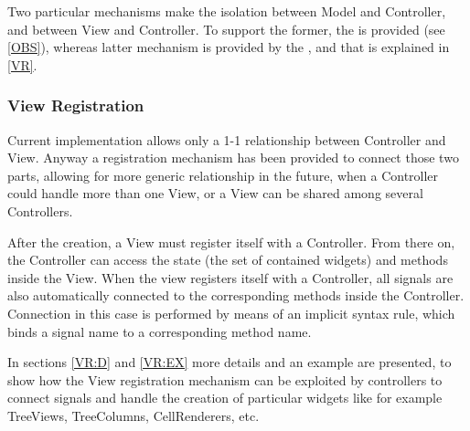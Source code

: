 Two particular mechanisms make the isolation between Model and
Controller, and between View and Controller. To support the former,
the \obs is provided (see \ref{OBS}), whereas latter mechanism is
provided by the \mvc, and that is explained in \ref{VR}.


\subsubsection{\label{VR} View Registration}
Current implementation allows only a 1-1 relationship between
Controller and View. Anyway a registration mechanism has been provided
to connect those two parts, allowing for more generic relationship in
the future, when a Controller could handle more than one View, or a
View can be shared among several Controllers.

After the creation, a View must register itself with a Controller.
From there on, the Controller can access the state (the set of
contained widgets) and methods inside the View. When the view
registers itself with a Controller, all signals are also automatically
connected to the corresponding methods inside the Controller.
Connection in this case is performed by means of an implicit syntax
rule, which binds a signal name to a corresponding method name.

In sections \ref{VR:D} and \ref{VR:EX} more details and an example are
presented, to show how the View registration mechanism can be
exploited by controllers to connect signals and handle the creation of
particular widgets like for example TreeViews, TreeColumns,
CellRenderers, etc.
